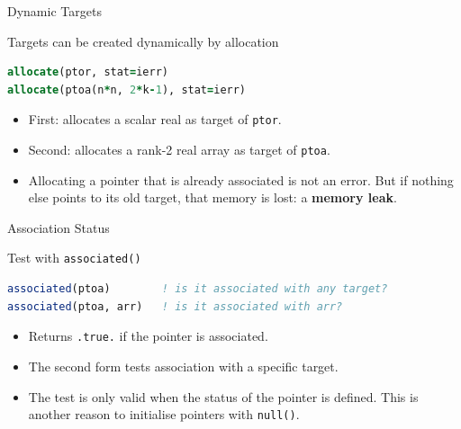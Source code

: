 \begin{frame}[fragile]{Dynamic Targets}

  \begin{block}{Targets can be created dynamically by allocation}
\begin{lstlisting}[language=Fortran]
allocate(ptor, stat=ierr)
allocate(ptoa(n*n, 2*k-1), stat=ierr)
\end{lstlisting}
    \begin{itemize}
      \item First: allocates a scalar real as target of \texttt{ptor}.
      \item Second: allocates a rank-2 real array as target of \texttt{ptoa}.
      \item Allocating a pointer that is already associated is not an error. But if nothing else points to its old target, that memory is lost: a \textbf{memory leak}.
    \end{itemize}
  \end{block}
\end{frame}

\begin{frame}[fragile]{Association Status}
  \begin{block}{Test with \texttt{associated()}}
\begin{lstlisting}[language=Fortran]
associated(ptoa)        ! is it associated with any target?
associated(ptoa, arr)   ! is it associated with arr?
\end{lstlisting}
    \begin{itemize}
      \item Returns \texttt{.true.} if the pointer is associated.
      \item The second form tests association with a specific target.
      \item The test is only valid when the status of the pointer is defined. This is another reason to initialise pointers with \texttt{null()}.
    \end{itemize}
  \end{block}
\end{frame}


